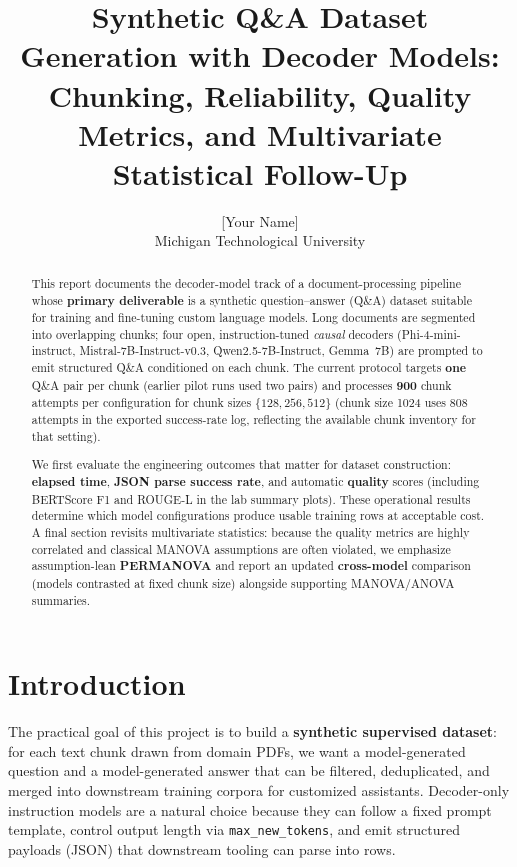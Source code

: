 \documentclass[11pt]{article}
\title{Synthetic Q\&A Dataset Generation with Decoder Models:\\
Chunking, Reliability, Quality Metrics, and Multivariate Statistical Follow-Up}
\author{[Your Name]\\Michigan Technological University}
\date{}
\begin{document}
\maketitle

\begin{abstract}
This report documents the decoder-model track of a document-processing pipeline whose \textbf{primary deliverable} is a synthetic question--answer (Q\&A) dataset suitable for training and fine-tuning custom language models. Long documents are segmented into overlapping chunks; four open, instruction-tuned \emph{causal} decoders (Phi-4-mini-instruct, Mistral-7B-Instruct-v0.3, Qwen2.5-7B-Instruct, Gemma~7B) are prompted to emit structured Q\&A conditioned on each chunk. The current protocol targets \textbf{one} Q\&A pair per chunk (earlier pilot runs used two pairs) and processes \textbf{900} chunk attempts per configuration for chunk sizes $\{128,256,512\}$ (chunk size 1024 uses 808 attempts in the exported success-rate log, reflecting the available chunk inventory for that setting).

We first evaluate the engineering outcomes that matter for dataset construction: \textbf{elapsed time}, \textbf{JSON parse success rate}, and automatic \textbf{quality} scores (including BERTScore F1 and ROUGE-L in the lab summary plots). These operational results determine which model configurations produce usable training rows at acceptable cost. A final section revisits multivariate statistics: because the quality metrics are highly correlated and classical MANOVA assumptions are often violated, we emphasize assumption-lean \textbf{PERMANOVA} and report an updated \textbf{cross-model} comparison (models contrasted at fixed chunk size) alongside supporting MANOVA/ANOVA summaries.
\end{abstract}

\tableofcontents
\newpage

\section{Introduction}

The practical goal of this project is to build a \textbf{synthetic supervised dataset}: for each text chunk drawn from domain PDFs, we want a model-generated question and a model-generated answer that can be filtered, deduplicated, and merged into downstream training corpora for customized assistants. Decoder-only instruction models are a natural choice because they can follow a fixed prompt template, control output length via \texttt{max\_new\_tokens}, and emit structured payloads (JSON) that downstream tooling can parse into rows.
\end{document}
